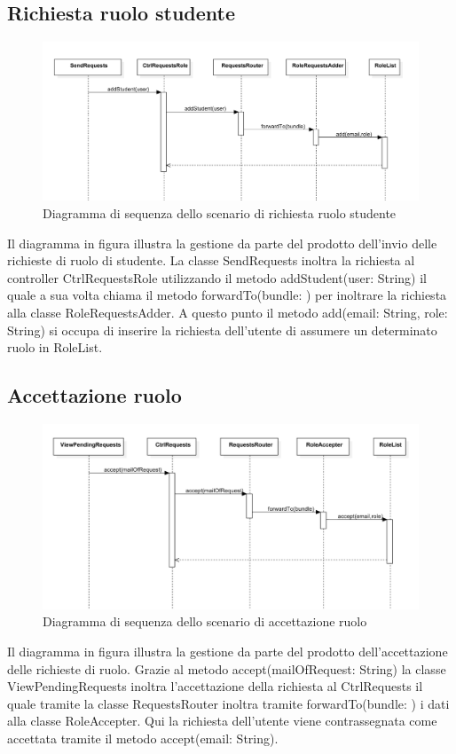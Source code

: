 \documentclass[a4paper, titlepage]{article}
\begin{document}
\newpage
\subsection{Richiesta ruolo studente}
\begin{figure}[!h]
	\centering
	\includegraphics[scale=0.5]{Img/seq-rolerequest.pdf}
	\caption{Diagramma di sequenza dello scenario di richiesta ruolo studente }
\end{figure}
Il diagramma in figura illustra la gestione da parte del prodotto dell'invio delle richieste di ruolo di studente. La classe SendRequests inoltra la richiesta al controller CtrlRequestsRole utilizzando il metodo addStudent(user: String) il quale a sua volta chiama il metodo forwardTo(bundle: ) per inoltrare la richiesta alla classe RoleRequestsAdder. A questo punto il metodo add(email: String, role: String) si occupa di inserire la richiesta dell'utente di assumere un determinato ruolo in RoleList.

\subsection{Accettazione ruolo}
\begin{figure}[!h]
	\centering
	\includegraphics[scale=0.5]{Img/seq-acceptrequest.pdf}
	\caption{Diagramma di sequenza dello scenario di accettazione ruolo}
\end{figure}
Il diagramma in figura illustra la gestione da parte del prodotto dell'accettazione delle richieste di ruolo. Grazie al metodo accept(mailOfRequest: String) la classe ViewPendingRequests inoltra l'accettazione della richiesta al CtrlRequests il quale tramite la classe RequestsRouter inoltra tramite forwardTo(bundle: ) i dati alla classe RoleAccepter. Qui la richiesta dell'utente viene contrassegnata come accettata tramite il metodo accept(email: String).
\end{document}
